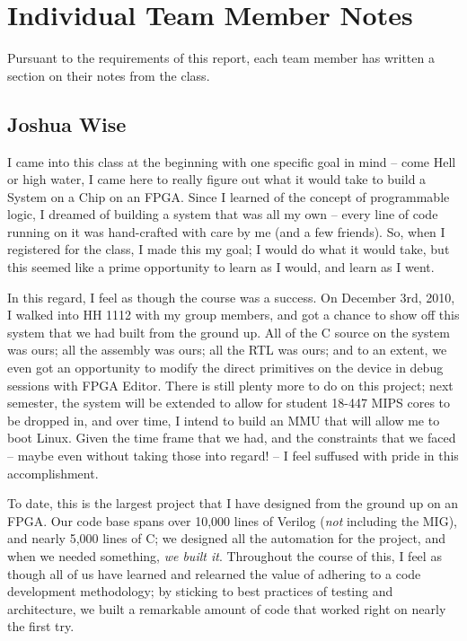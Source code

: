\documentclass[10pt]{report}
\begin{document}
\section{Individual Team Member Notes}

Pursuant to the requirements of this report, each team member has written a
section on their notes from the class.

\subsection{Joshua Wise}

I came into this class at the beginning with one specific goal in mind --
come Hell or high water, I came here to really figure out what it would take
to build a System on a Chip on an FPGA.  Since I learned of the concept of
programmable logic, I dreamed of building a system that was all my own --
every line of code running on it was hand-crafted with care by me (and a few
friends).  So, when I registered for the class, I made this my goal; I would
do what it would take, but this seemed like a prime opportunity to learn as
I would, and learn as I went.

In this regard, I feel as though the course was a success.  On December 3rd,
2010, I walked into HH 1112 with my group members, and got a chance to show
off this system that we had built from the ground up.  All of the C source
on the system was ours; all the assembly was ours; all the RTL was ours; and
to an extent, we even got an opportunity to modify the direct primitives on
the device in debug sessions with FPGA Editor.  There is still plenty more
to do on this project; next semester, the system will be extended to allow
for student 18-447 MIPS cores to be dropped in, and over time, I intend to
build an MMU that will allow me to boot Linux.  Given the time frame that we
had, and the constraints that we faced -- maybe even without taking those
into regard! -- I feel suffused with pride in this accomplishment.

To date, this is the largest project that I have designed from the ground up
on an FPGA.  Our code base spans over 10,000 lines of Verilog (\textit{not}
including the MIG), and nearly 5,000 lines of C; we designed all the
automation for the project, and when we needed something, \textit{we built
it}.  Throughout the course of this, I feel as though all of us have learned
and relearned the value of adhering to a code development methodology; by
sticking to best practices of testing and architecture, we built a
remarkable amount of code that worked right on nearly the first try.
\end{document}
